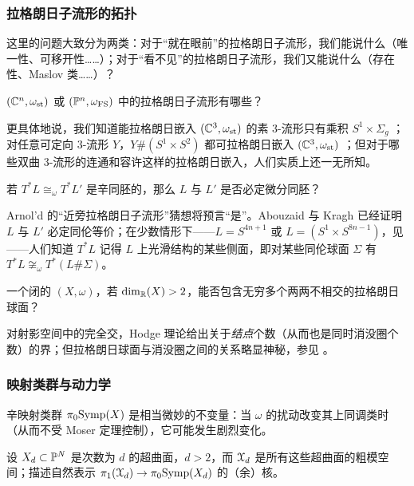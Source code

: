 \subsubsection{拉格朗日子流形的拓扑}

这里的问题大致分为两类：对于“就在眼前”的拉格朗日子流形，我们能说什么（唯一性、可移开性……）；对于“看不见”的拉格朗日子流形，我们又能说什么（存在性、Maslov 类……）？

\begin{Question} $(\mathbb{C}^n, \omega_{\operatorname{st}})$ 或 $(\mathbb{P}^n, \omega_{\operatorname{FS}})$ 中的拉格朗日子流形有哪些？ \end{Question}

更具体地说，我们知道能拉格朗日嵌入 $(\mathbb{C}^3,\omega_{\operatorname{st}})$ 的素 3-流形只有乘积 $S^1\times \Sigma_g$ \cite{Fukaya:LagC3}；对任意可定向 3-流形 $Y$，$Y\#(S^1\times S^2)$ 都可拉格朗日嵌入 $(\mathbb{C}^3,\omega_{\operatorname{st}})$ \cite{YETI}；但对于哪些双曲 3-流形的连通和容许这样的拉格朗日嵌入，人们实质上还一无所知。

\begin{Question}\label{Q:Arnold} 若 $T^*L \cong_{\omega} T^*L'$ 是辛同胚的，那么 $L$ 与 $L'$ 是否必定微分同胚？ \end{Question}

Arnol'd 的“近旁拉格朗日子流形”猜想将预言“是”。Abouzaid 与 Kragh \cite{Kragh,Abouzaid:Maslov0} 已经证明 $L$ 与 $L'$ 必定同伦等价；在少数情形下——$L=S^{4n+1}$ 或 $L= (S^1\times S^{8n-1})$，见 \cite{Abouzaid:exotic,EkholmSmith}——人们知道 $T^*L$ 记得 $L$ 上光滑结构的某些侧面，即对某些同伦球面 $\Sigma$ 有 $T^*L \not\cong_{\omega} T^*(L\#\Sigma)$。

\begin{Question} 一个闭的 $(X,\omega)$，若 $\dim_{\mathbb{R}}(X)>2$，能否包含无穷多个两两不相交的拉格朗日球面？ \end{Question}

对射影空间中的完全交，Hodge 理论给出关于\emph{结点}个数（从而也是同时消没圈个数）的界；但拉格朗日球面与消没圈之间的关系略显神秘，参见 \cite{CortiSmith}。

\subsubsection{映射类群与动力学}

辛映射类群 $\pi_0 \mathrm{Symp}(X)$ 是相当微妙的不变量：当 $\omega$ 的扰动改变其上同调类时（从而不受 Moser 定理控制），它可能发生剧烈变化。

\begin{Question}\label{Question:Monodromy} 设 $X_d \subset \mathbb{P}^N$ 是次数为 $d$ 的超曲面，$d>2$，而 $\EuScript{X}_d$ 是所有这些超曲面的粗模空间；描述自然表示 $\pi_1(\EuScript{X}_d) \rightarrow \pi_0\mathrm{Symp}(X_d)$ 的（余）核。 \end{Question}

